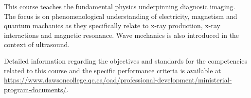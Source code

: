 {This course teaches the fundamental physics underpinning diagnosic imaging. The focus is on phenomenological understanding of electricity, magnetism and quantum machanics as they specifically relate to x-ray production, x-ray interactions and magnetic resonance. Wave mechanics is also introduced in the context of ultrasound. 
\smallskip

Detailed information regarding the objectives and standards for the competencies related to this course and the specific performance criteria is available at \url{https://www.dawsoncollege.qc.ca/oad/professional-development/ministerial-program-documents/}.}
